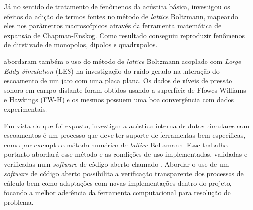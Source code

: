 Já no sentido de tratamento de fenômenos da acústica básica,  investigou os efeitos da adição de termos fontes no método de \textit{lattice} Boltzmann, mapeando eles nos parâmetros macroscópicos através da ferramenta matemática de expansão de Chapman-Enskog. Como resultado conseguiu reproduzir fenômenos de diretivade de monopolos, dipolos e quadrupolos.

 abordaram também o uso do método de \textit{lattice} Boltzmann acoplado com \textit{Large} \textit{Eddy} \textit{Simulation} (LES) na investigação do ruído gerado na interação do escoamento de um jato com uma placa plana. Os dados de níveis de pressão sonora em campo distante foram obtidos usando a superfície de Ffowcs-Williams e Hawkings (FW-H) e os mesmos possuem uma boa convergência com dados experimentais.

Em vista do que foi exposto, investigar a acústica interna de dutos circulares com escoamentos é um processo que deve ter suporte de ferramentas bem específicas, como por exemplo o método numérico de \textit{lattice} Boltzmann. Esse trabalho portanto abordará esse método e as condições de uso implementadas, validadas e verificadas num \textit{software} de código aberto chamado . Abordar o uso de um \textit{software} de código aberto possibilita a verificação transparente dos processos de cálculo bem como adaptações com novas implementações dentro do projeto, focando a melhor aderência da ferramenta computacional para resolução do problema.